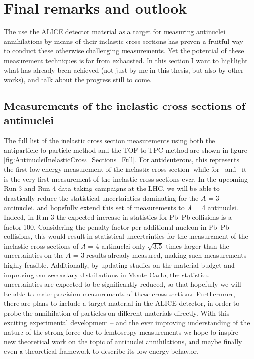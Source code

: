 \section{Final remarks and outlook}

The use the ALICE detector material as a target for measuring antinuclei annihilations by means of their inelastic cross sections has proven a fruitful way to conduct these otherwise challenging measurements. Yet the potential of these measurement techniques is far from exhausted. In this section I want to highlight what has already been achieved (not just by me in this thesis, but also by other works), and talk about the progress still to come. \\

\subsection{Measurements of the inelastic cross sections of antinuclei}

The full list of the inelastic cross section measurements using both the antiparticle-to-particle method and the TOF-to-TPC method are shown in figure \ref{fig:AntinucleiInelasticCross_Sections_Full}. For antideuterons, this represents the first low energy measurement of the inelastic cross section, while for \ahe\ and \atrit\ it is the very first measurement of the inelastic cross sections ever. In the upcoming Run 3 and Run 4 data taking campaigns at the LHC, we will be able to drastically reduce the statistical uncertainties dominating for the $A$ = 3 antinuclei, and hopefully extend this set of measurements to $A$ = 4 antinuclei. Indeed, in Run 3 the expected increase in statistics for Pb--Pb collisions is a factor 100. Considering the penalty factor per additional nucleon in Pb--Pb collisions, this would result in statistical uncertainties for the measurement of the inelastic cross sections of $A$ = 4 antinuclei only $\sqrt{3.5}$ times larger than the uncertainties on the $A$ = 3 results already measured, making such measurements highly feasible. Additionally, by updating studies on the material budget and improving our secondary distributions in Monte Carlo, the statistical uncertainties are expected to be significantly reduced, so that hopefully we will be able to make precision measurements of these cross sections. Furthermore, there are plans to include a target material in the ALICE detector, in order to probe the annihilation of particles on different materials directly. With this exciting experimental development -- and the ever improving understanding of the nature of the strong force due to femtoscopy measurements \cite{Three_body_femto} %
we hope to inspire new theoretical work on the topic of antinuclei annihilations, and maybe finally even a theoretical framework to describe its low energy behavior. \\

